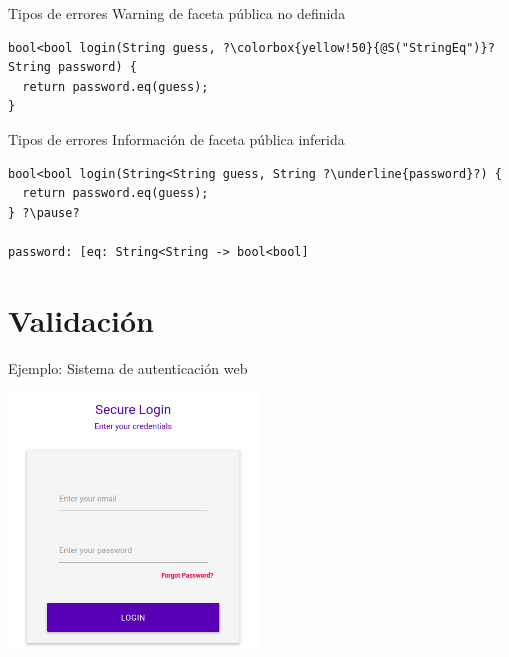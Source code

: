 \documentclass[aspectratio=169,10pt]{beamer}
\begin{document}
\begin{frame}[fragile]{Tipos de errores}
	Warning de faceta pública no definida \\ \pause
	\vspace{1cm}
\begin{lstlisting}[escapechar=?,basicstyle=\fontsize{9}{9}\ttfamily]
bool<bool login(String guess, ?\colorbox{yellow!50}{@S("StringEq")}? String password) {
  return password.eq(guess);
}
\end{lstlisting}
\end{frame}

\begin{frame}[fragile]{Tipos de errores}
	Información de faceta pública inferida \\ \pause
	\vspace{1cm}
\begin{lstlisting}[escapechar=?,basicstyle=\fontsize{9}{9}\ttfamily]
bool<bool login(String<String guess, String ?\underline{password}?) {
  return password.eq(guess);
} ?\pause?

password: [eq: String<String -> bool<bool]
\end{lstlisting}
\end{frame}

\section{Validación}

\begin{frame}[fragile]{Ejemplo: Sistema de autenticación web}
	\begin{center}
		\includegraphics[width=0.5\textwidth]{images/screen4.png}
	\end{center}
\end{frame}
\end{document}
